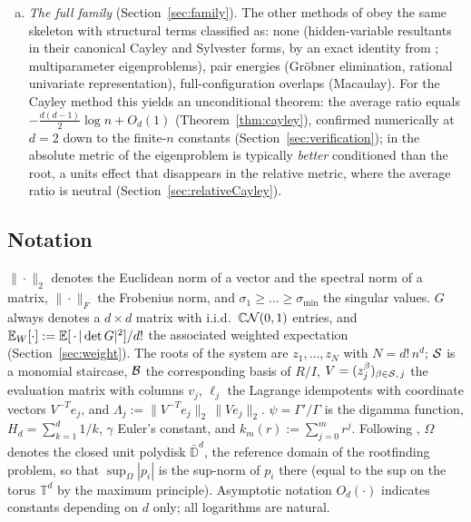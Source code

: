 \begin{enumerate}[(a)]
    $d=1,2$; the regime at $d\ge3$ is open.
  \item \emph{The full family} (Section~\ref{sec:family}). The other methods of
    \cite{graf2026numerical} obey the same skeleton with structural terms classified as: none
    (hidden-variable resultants in their canonical Cayley and Sylvester forms, by an exact
    identity from \cite{noferini2016numerical}; multiparameter eigenproblems), pair energies
    (Gr\"obner elimination, rational univariate representation), full-configuration overlaps
    (Macaulay). For the Cayley method this yields an unconditional theorem: the average ratio
    equals $-\frac{d(d-1)}{2}\log n + O_d(1)$ (Theorem~\ref{thm:cayley}), confirmed
    numerically at $d=2$ down to the finite-$n$ constants (Section~\ref{sec:verification});
    in the absolute metric of \cite{noferini2016numerical} the eigenproblem is typically
    \emph{better} conditioned than the root, a units effect that disappears in the relative
    metric, where the average ratio is neutral (Section~\ref{sec:relativeCayley}).
\end{enumerate}

\subsection{Notation}

$\|\cdot\|_2$ denotes the Euclidean norm of a vector and the spectral norm of a matrix,
$\|\cdot\|_F$ the Frobenius norm, and $\sigma_1\ge\dots\ge\sigma_{\min}$ the singular values.
$G$ always denotes a $d\times d$ matrix with i.i.d.\ $\mathbb{C}\mathcal{N}(0,1)$ entries, and
$\mathbb{E}_{W}[\cdot] := \mathbb{E}[\,\cdot\,|\det G|^2]/d!$ the associated weighted expectation
(Section~\ref{sec:weight}). The roots of the system are $z_1,\dots,z_N$ with $N=d!\,n^d$;
$\mathcal{S}$ is a monomial staircase, $\mathcal{B}$ the corresponding basis of $R/I$,
$V=(z_j^\beta)_{\beta\in\mathcal{S},\,j}$ the evaluation matrix with columns $v_j$, $\ell_j$ the
Lagrange idempotents with coordinate vectors $V^{-T}e_j$, and
$\Lambda_j := \|V^{-T}e_j\|_2\,\|Ve_j\|_2$. $\psi=\Gamma'/\Gamma$ is the digamma function,
$H_d=\sum_{k=1}^d 1/k$, $\gamma$ Euler's constant, and $k_m(r):=\sum_{j=0}^m r^j$. Following
\cite{noferini2016numerical}, $\Omega$ denotes the closed unit polydisk
$\bar{\mathbb{D}}^d$, the reference domain of the rootfinding problem, so that
$\sup_\Omega|p_i|$ is the sup-norm of $p_i$ there (equal to the sup on the torus
$\mathbb{T}^d$ by the maximum principle). Asymptotic notation $O_d(\cdot)$ indicates
constants depending on $d$ only; all logarithms are natural.
